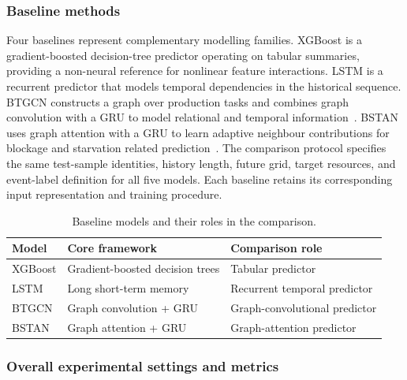 \documentclass[a4paper,fleqn]{cas-dc}
\begin{document}
\subsubsection{Baseline methods}

Four baselines represent complementary modelling families. XGBoost is a gradient-boosted decision-tree predictor operating on tabular summaries, providing a non-neural reference for nonlinear feature interactions. LSTM is a recurrent predictor that models temporal dependencies in the historical sequence. BTGCN constructs a graph over production tasks and combines graph convolution with a GRU to model relational and temporal information~\cite{yin2025btgcn}. BSTAN uses graph attention with a GRU to learn adaptive neighbour contributions for blockage and starvation related prediction~\cite{lai2023bstan}. The comparison protocol specifies the same test-sample identities, history length, future grid, target resources, and event-label definition for all five models. Each baseline retains its corresponding input representation and training procedure.


\begin{table}[t]
\centering
\caption{Baseline models and their roles in the comparison.}
\label{tab:exp-baselines}
\scriptsize
\setlength{\tabcolsep}{4pt}
\renewcommand{\arraystretch}{1.10}
\begin{tabularx}{\columnwidth}{@{}lXX@{}}
\toprule
Model & Core framework & Comparison role \\
\midrule
XGBoost & Gradient-boosted decision trees & Tabular predictor \\
LSTM & Long short-term memory & Recurrent temporal predictor \\
BTGCN & Graph convolution + GRU & Graph-convolutional predictor \\
BSTAN & Graph attention + GRU & Graph-attention predictor \\
\bottomrule
\end{tabularx}
\end{table}

\subsubsection{Overall experimental settings and metrics}
\end{document}
